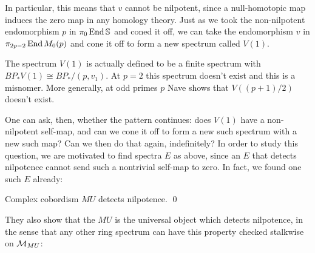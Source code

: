 \noindent In particular, this means that $v$ cannot be nilpotent, since a null-homotopic map induces the zero map in any homology theory.  Just as we took the non-nilpotent endomorphism $p$ in $\pi_0 \operatorname{End} \mathbb S$ and coned it off, we can take the endomorphism $v$ in $\pi_{2p-2} \operatorname{End} M_0(p)$ and cone it off to form a new spectrum called $V(1)$.

\begin{remark}
The spectrum $V(1)$ is actually defined to be a finite spectrum with $BP_* V(1) \cong BP_* / (p, v_1)$. At $p = 2$ this spectrum doesn't exist and this is a misnomer.  More generally, at odd primes $p$ Nave shows that $V((p+1)/2)$ doesn't exist.
\end{remark}

One can ask, then, whether the pattern continues: does $V(1)$ have a non-nilpotent self-map, and can we cone it off to form a new such spectrum with a new such map?  Can we then do that again, indefinitely?  In order to study this question, we are motivated to find spectra $E$ as above, since an $E$ that detects nilpotence cannot send such a nontrivial self-map to zero.  In fact, we found one such $E$ already:

\begin{theorem}\label{DevinatzHopkinsSmith}
Complex cobordism $MU$ detects nilpotence. \qed
\end{theorem}

They also show that the $MU$ is the universal object which detects nilpotence, in the sense that any other ring spectrum can have this property checked stalkwise on $\mathcal{M}_{MU}$:

